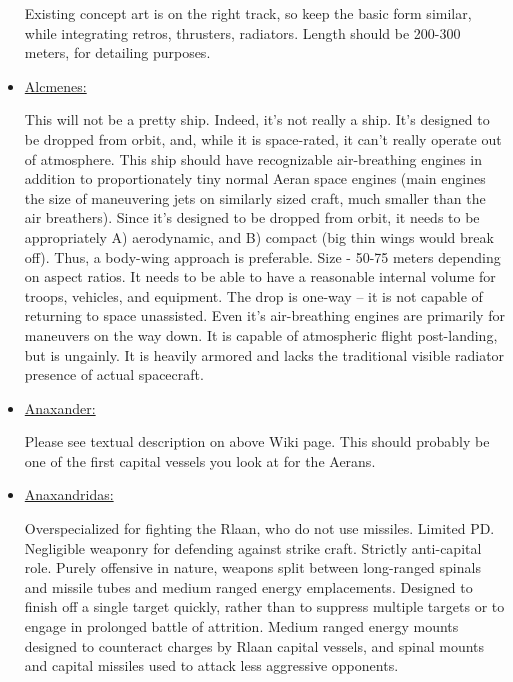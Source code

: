 \begin{itemize}
Existing concept art is on the right track, so keep the basic form
similar, while integrating retros, thrusters, radiators. Length should
be 200-300 meters, for detailing purposes.



\item \href{http://vegastrike.sourceforge.net/wiki/Vessel:Alcmenes}{Alcmenes:}

This will not be a pretty ship. Indeed, it's not really a ship. It's
designed to be dropped from orbit, and, while it is space-rated, it
can't really operate out of atmosphere. This ship should have
recognizable air-breathing engines in addition to proportionately tiny
normal Aeran space engines (main engines the size of maneuvering jets
on similarly sized craft, much smaller than the air breathers). Since
it's designed to be dropped from orbit, it needs to be appropriately
A) aerodynamic, and B) compact (big thin wings would break off). Thus,
a body-wing approach is preferable. Size - 50-75 meters depending on
aspect ratios. It needs to be able to have a reasonable internal
volume for troops, vehicles, and equipment. The drop is one-way -- it
is not capable of returning to space unassisted. Even it's
air-breathing engines are primarily for maneuvers on the way down. It
is capable of atmospheric flight post-landing, but is ungainly. It is
heavily armored and lacks the traditional visible radiator presence of
actual spacecraft.

\item \href{http://vegastrike.sourceforge.net/wiki/Vessel:Anaxander}{Anaxander:}

Please see textual description on above Wiki page. This should
probably be one of the first capital vessels you look at for the
Aerans.


\item \href{http://vegastrike.sourceforge.net/wiki/Vessel:Anaxandridas}{Anaxandridas:}

Overspecialized for fighting the Rlaan, who do not use
missiles. Limited PD. Negligible weaponry for defending against strike
craft. Strictly anti-capital role. Purely offensive in nature, weapons
split between long-ranged spinals and missile tubes and medium ranged
energy emplacements. Designed to finish off a single target quickly,
rather than to suppress multiple targets or to engage in prolonged
battle of attrition. Medium ranged energy mounts designed to
counteract charges by Rlaan capital vessels, and spinal mounts and
capital missiles used to attack less aggressive opponents.



\end{itemize}
